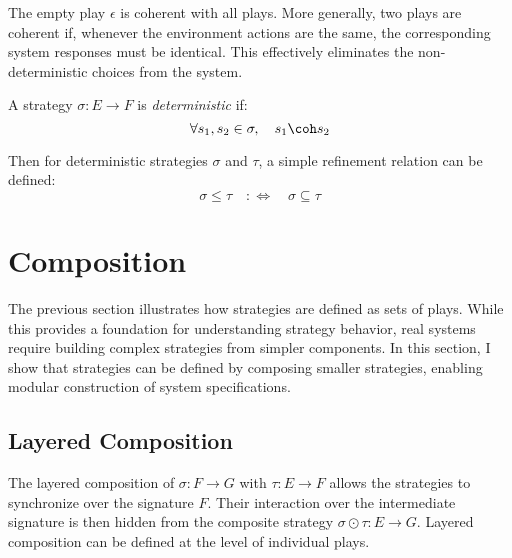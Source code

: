 The empty play $\epsilon$ is coherent with all plays.
More generally,
two plays are coherent if,
whenever the environment actions are the same,
the corresponding system responses must be identical.
This effectively eliminates the non-deterministic choices from the system.

\begin{definition}
  A strategy $\sigma : E \rightarrow F$ is \emph{deterministic}
  if:
  \[
    \forall s_1, s_2 \in \sigma, \quad s_1 \coh s_2
  \]
\end{definition}
Then for deterministic strategies $\sigma$ and $\tau$,
a simple refinement relation can be defined:
\[
  \sigma \le \tau \quad :\Leftrightarrow\quad \sigma \subseteq \tau
\]

\section{Composition}
\label{sec:strat:composition}

The previous section
illustrates how strategies are defined
as sets of plays.
While this provides a foundation for understanding strategy behavior,
real systems require building complex strategies from simpler components.
In this section,
I show that strategies can be defined
by composing smaller strategies,
enabling modular construction of system specifications.

\subsection{Layered Composition}

The layered
composition of
$\sigma : F \rightarrow G$ with
$\tau : E \rightarrow F$
allows the strategies to synchronize
over the signature $F$.
Their interaction over the intermediate signature is then hidden from
the composite strategy $\sigma \odot \tau : E \rightarrow G$.
Layered composition can be defined
at the level of individual plays.

